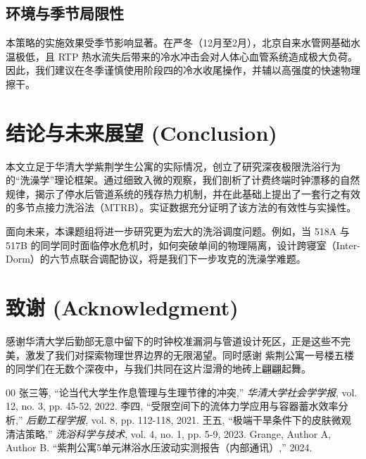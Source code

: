 ﻿\documentclass[10pt, conference, a4paper]{IEEEtran}
\begin{document}
\subsection{环境与季节局限性}
本策略的实施效果受季节影响显著。在严冬（12月至2月），北京自来水管网基础水温极低，且 RTP 热水流失后带来的冷水冲击会对人体心血管系统造成极大负荷。因此，我们建议在冬季谨慎使用阶段四的冷水收尾操作，并辅以高强度的快速物理擦干。

\section{结论与未来展望 (Conclusion)}

本文立足于华清大学紫荆学生公寓的实际情况，创立了研究深夜极限洗浴行为的“洗澡学”理论框架。通过细致入微的观察，我们剖析了计费终端时钟漂移的自然规律，揭示了停水后管道系统的残存热力机制，并在此基础上提出了一套行之有效的多节点接力洗浴法（MTRB）。实证数据充分证明了该方法的有效性与实操性。

面向未来，本课题组将进一步研究更为宏大的洗浴调度问题。例如，当 518A 与 517B 的同学同时面临停水危机时，如何突破单间的物理隔离，设计跨寝室（Inter-Dorm）的六节点联合调配协议，将是我们下一步攻克的洗澡学难题。

\section*{致谢 (Acknowledgment)}
感谢华清大学后勤部无意中留下的时钟校准漏洞与管道设计死区，正是这些不完美，激发了我们对探索物理世界边界的无限渴望。同时感谢 紫荆公寓一号楼五楼的同学们在无数个深夜中，与我们共同在这片湿滑的地砖上翩翩起舞。

\begin{thebibliography}{00}
 张三等, ``论当代大学生作息管理与生理节律的冲突,'' \textit{华清大学社会学学报}, vol. 12, no. 3, pp. 45-52, 2022.
 李四, ``受限空间下的流体力学应用与容器蓄水效率分析,'' \textit{后勤工程学报}, vol. 8, pp. 112-118, 2021.
 王五, ``极端干旱条件下的皮肤微观清洁策略,'' \textit{洗浴科学与技术}, vol. 4, no. 1, pp. 5-9, 2023.
 Grange, Author A, Author B. ``紫荆公寓5单元淋浴水压波动实测报告（内部通讯）,'' 2024.
\end{thebibliography}
\end{document}
